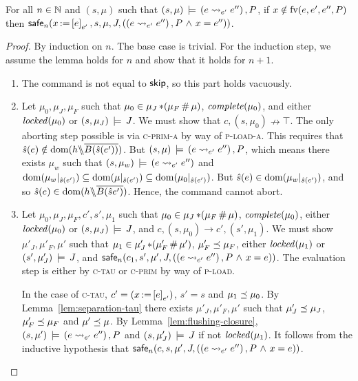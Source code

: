 \documentclass[11pt]{article}
\begin{document}
\begin{lemma}
	\label{lem:load-safe}
	For all $n \in \mathbb{N}$ and $(s,\mu)$ such that $(s,\mu) \,\models\, (e \leadsto_{e'} e'') \operatorname{,} P$, if $x \notin \mathrm{fv}(e,e',e'',P)$ then $\mathsf{safe}_{n}(x \operatorname{:\!=} \left[ e \right]_{e'},s,\mu,J,\left((e \leadsto_{e'} e'') \operatorname{,} P \operatorname{\,\wedge\,} x = e''\right))$. 
\end{lemma}

\begin{proof}
	By induction on $n$. The base case is trivial. For the induction step, we assume the lemma holds for $n$ and show that it holds for $n+1$.

	\begin{enumerate}
		\item The command is not equal to $\operatorname{\mathsf{skip}}$, so this part holds vacuously. 

		\item Let $\mu_0,\mu_J,\mu_F$ such that $\mu_0 \in \mu_J \operatorname{\ast} (\mu_F \operatorname{\#} \mu)$, $\mathit{complete}(\mu_0)$, and either $\mathit{locked}(\mu_0)$ or $(s,\mu_J) \,\models\, J$. We must show that $c,(s,\mu_0) \nrightarrow \top$. The only aborting step possible is via \textsc{c-prim-a} by way of \textsc{p-load-a}. This requires that $\hat{s}(e) \notin \operatorname{\mathrm{dom}}(h \backslash\!\!\backslash \overline{B(\hat{s}(e'))})$. But $(s,\mu) \,\models\, (e \leadsto_{e'} e'') \operatorname{,} P$, which means there exists $\mu_w$ such that $(s,\mu_w) \,\models\, (e \leadsto_{e'} e'')$ and $\operatorname{\mathrm{dom}}(\mu_w |_{\hat{s}(e')}) \subseteq \operatorname{\mathrm{dom}}(\mu |_{\hat{s}(e')}) \subseteq \operatorname{\mathrm{dom}}(\mu_0 |_{\hat{s}(e')})$. But $\hat{s}(e) \in \operatorname{\mathrm{dom}}(\mu_w |_{\hat{s}(e')})$, and so $\hat{s}(e) \in \operatorname{\mathrm{dom}}(h \backslash\!\!\backslash \overline{B(\hat{s}e')})$. Hence, the command cannot abort. 

		\item Let $\mu_0,\mu_J,\mu_F,c',s',\mu_1$ such that $\mu_0 \in \mu_J \operatorname{\ast} (\mu_F \operatorname{\#} \mu)$, $\mathit{complete}(\mu_0)$, either $\mathit{locked}(\mu_0)$ or $(s,\mu_J) \,\models\, J$, and $c,(s,\mu_0) \rightarrow c',(s',\mu_1)$. We must show $\mu'_J,\mu'_F,\mu'$ such that $\mu_1 \in \mu'_J \operatorname{\ast} (\mu'_F \operatorname{\#} \mu')$, $\mu'_F \preceq \mu_F$, either $\mathit{locked}(\mu_1)$ or $(s',\mu'_J) \,\models\, J$, and $\mathsf{safe}_{n}(c_1,s',\mu',J,((e \leadsto_{e'} e'') \operatorname{,} P \operatorname{\,\wedge\,} x = e))$. The evaluation step is either by \textsc{c-tau} or \textsc{c-prim} by way of \textsc{p-load}. 

		In the case of \textsc{c-tau}, $c' = (x \operatorname{:\!=} \left[ e \right]_{e'})$, $s' = s$ and $\mu_1 \preceq \mu_0$. By Lemma~\ref{lem:separation-tau} there exists $\mu'_J,\mu'_F,\mu'$ such that $\mu'_J \preceq \mu_J$, $\mu'_F \preceq \mu_F$ and $\mu' \preceq \mu$. By Lemma~\ref{lem:flushing-closure}, $(s,\mu') \,\models\, (e \leadsto_{e'} e'') \operatorname{,} P$ and $(s,\mu'_J) \,\models\, J$ if not $\mathit{locked}(\mu_1)$. It follows from the inductive hypothesis that $\mathsf{safe}_{n}(c,s,\mu',J,((e \leadsto_{e'} e'') \operatorname{,} P \operatorname{\,\wedge\,} x = e))$. 


\end{enumerate}
\end{proof}
\end{document}
